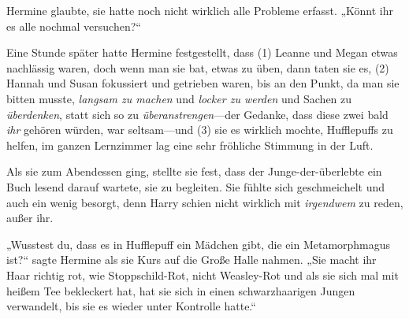 



Hermine glaubte, sie hatte noch nicht wirklich alle Probleme erfasst. „Könnt ihr es alle nochmal versuchen?“

Eine Stunde später hatte Hermine festgestellt, dass (1) Leanne und Megan etwas nachlässig waren, doch wenn man sie bat, etwas zu üben, dann taten sie es, (2) Hannah und Susan fokussiert und getrieben waren, bis an den Punkt, da man sie bitten musste, \emph{langsam zu machen} und \emph{locker zu werden} und Sachen zu \emph{überdenken}, statt sich so zu \emph{überanstrengen}—der Gedanke, dass diese zwei bald \emph{ihr} gehören würden, war seltsam—und (3) sie es wirklich mochte, Hufflepuffs zu helfen, im ganzen Lernzimmer lag eine sehr fröhliche Stimmung in der Luft.

Als sie zum Abendessen ging, stellte sie fest, dass der Junge-der-überlebte ein Buch lesend darauf wartete, sie zu begleiten. Sie fühlte sich geschmeichelt und auch ein wenig besorgt, denn Harry schien nicht wirklich mit \emph{irgendwem} zu reden, außer ihr.

„Wusstest du, dass es in Hufflepuff ein Mädchen gibt, die ein Metamorphmagus ist?“ sagte Hermine als sie Kurs auf die Große Halle nahmen. „Sie macht ihr Haar richtig rot, wie Stoppschild-Rot, nicht Weasley-Rot und als sie sich mal mit heißem Tee bekleckert hat, hat sie sich in einen schwarzhaarigen Jungen verwandelt, bis sie es wieder unter Kontrolle hatte.“

